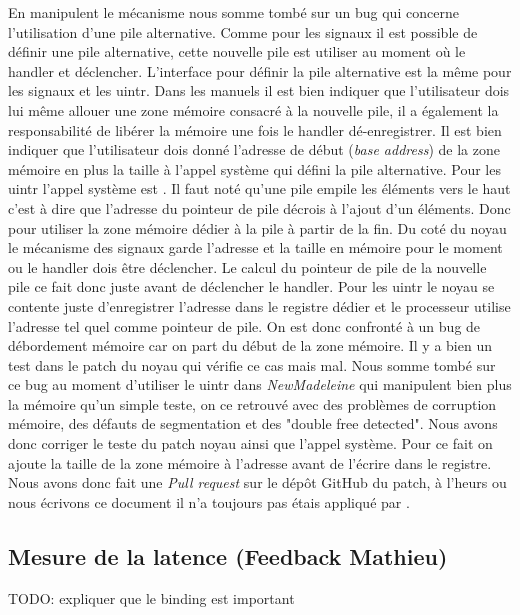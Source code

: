 En manipulent le mécanisme nous somme tombé sur un bug qui concerne l'utilisation d'une pile alternative.
Comme pour les signaux il est possible de définir une pile alternative, cette nouvelle pile est utiliser au moment où le handler et déclencher.
L'interface pour définir la pile alternative est la même pour les signaux et les uintr.
Dans les manuels il est bien indiquer que l'utilisateur dois lui même allouer une zone mémoire consacré à la nouvelle pile, il a également la responsabilité de libérer la mémoire une fois le handler dé-enregistrer.
Il est bien indiquer que l'utilisateur dois donné l'adresse de début (\emph{base address}) de la zone mémoire en plus la taille à l'appel système qui défini la pile alternative.
Pour les uintr l'appel système est .
Il faut noté qu'une pile empile les éléments vers le haut c'est à dire que l'adresse du pointeur de pile décrois à l'ajout d'un éléments.
Donc pour utiliser la zone mémoire dédier à la pile à partir de la fin.
Du coté du noyau le mécanisme des signaux garde l'adresse et la taille en mémoire pour le moment ou le handler dois être déclencher.
Le calcul du pointeur de pile de la nouvelle pile ce fait donc juste avant de déclencher le handler.
Pour les uintr le noyau se contente juste d'enregistrer l'adresse dans le registre dédier  et le processeur utilise l'adresse tel quel comme pointeur de pile.
On est donc confronté à un bug de débordement mémoire car on part du début de la zone mémoire.
Il y a bien un test dans le patch du noyau qui vérifie ce cas mais mal.
Nous somme tombé sur ce bug au moment d'utiliser le uintr dans \emph{NewMadeleine} qui manipulent bien plus la mémoire qu'un simple teste, on ce retrouvé avec des problèmes de corruption mémoire, des défauts de segmentation et des "double free detected".
Nous avons donc corriger le teste du patch noyau ainsi que l'appel système.
Pour ce fait on ajoute la taille de la zone mémoire à l'adresse avant de l'écrire dans le registre.
Nous avons donc fait une \emph{Pull request} sur le dépôt GitHub du patch, à l'heurs ou nous écrivons ce document il n'a toujours pas étais appliqué par \intel{}.

\subsection{Mesure de la latence (Feedback Mathieu)}
\label{sec:latencyMesure}

TODO: expliquer que le binding est important

